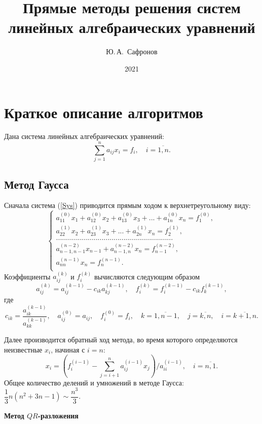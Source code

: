 \documentclass[12pt, a4paper]{article}
\title{Прямые методы решения систем линейных алгебраических уравнений}
\author{Ю.\,А.~Сафронов}
\date{2021}
\begin{document}
\maketitle
\tableofcontents 
\newpage

\section{Краткое описание алгоритмов}
Дана система линейных алгебраических уравнений:
\begin{equation}
\sum_{j=1}^{n} a_{ij}x_i = f_i , \quad i = \overline{1,n}.
\label{Sys}
\end{equation}

\subsection{Метод Гаусса}
Сначала система (\ref{Sys}) приводится прямым ходом к верхнетреугольному виду: 
\[\left\{
\begin{aligned}
a_{11}^{(0)}x_1 + a_{12}^{(0)}x_2 + a_{13}^{(0)}x_3 + ... + a_{1n}^{(0)}x_n = f_1^{(0)},\\
a_{22}^{(1)}x_2 + a_{23}^{(1)}x_3 + ... + a_{2n}^{(1)}x_n = f_2^{(1)},\\
...........................................................\\
a_{n-1,n-1}^{(n-2)}x_{n-1} + a_{n-1,n}^{(n-2)}x_n = f_{n-1}^{(n-2)},\\
a_{nn}^{(n-1)}x_n = f_{n}^{(n-1)}.\\
\end{aligned}
\right.
\]
Коэффициенты $a_{ij}^{(k)}$ и $f_i^{(k)}$ вычисляются следующим образом
\[
a_{ij}^{(k)} = a_{ij}^{(k-1)} - c_{ik}a_{kj}^{(k-1)}, \quad f_{i}^{(k)} = f_{i}^{(k-1)} - c_{ik}f_{k}^{(k-1)}, 
\]
где
\[
c_{ik} = \dfrac{a_{ik}^{(k-1)}}{a_{kk}^{(k-1)}}, \quad a_{ij}^{(0)}=a_{ij}, \quad f_{i}^{(0)} = f_i, \quad k = \overline{1,n-1},\quad j =\overline{k,n}, \quad i = \overline{k+1,n}.
\]

Далее производится обратный ход метода, во время которого определяются неизвестные $x_i$, начиная с $i = n$:
\[
x_i =\left(f_i^{(i-1)}-\sum_{j=i+1}^{n} a_{ij}^{(i-1)}x_j\right)/a_{ii}^{(i-1)}, \quad i = \overline{n,1}.
\]
Общее количество делений и умножений в методе Гаусса: $\dfrac{1}{3}n(n^2+3n-1) \sim \dfrac{n^3}{3}$.

\newpage

\begin{center}
    {\textbf 
        {Метод $QR$-разложения
        }
    }
\end{center}
    
\end{document}
